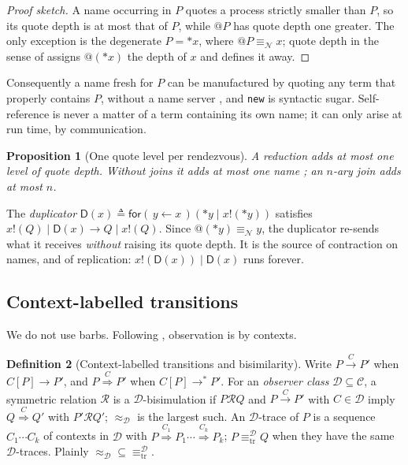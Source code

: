 \documentclass[11pt]{article}
\makeatletter
\theoremstyle{definition}
\newtheorem{definition}{Definition}[section]
\theoremstyle{plain}
\newtheorem{proposition}[definition]{Proposition}
\theoremstyle{remark}
\newcommand{\quo}[1]{@#1}
\newcommand{\drp}[1]{{*}#1}
\newcommand{\inp}[3]{\mathsf{for}(\,#1 \leftarrow #2\,)#3}
\newcommand{\out}[2]{#1!(#2)}
\newcommand{\nequiv}{\equiv_{\mathcal{N}}}
\newcommand{\Ctx}{\mathcal{C}}
\newcommand{\Obs}{\mathcal{D}}
\newcommand{\bisim}{\approx}
\newcommand{\treq}{\equiv_{\mathrm{tr}}}
\newcommand{\Lab}[1]{\xrightarrow{\,#1\,}}
\newcommand{\WLab}[1]{\overset{#1}{\Longrightarrow}}
\newcommand{\Dup}{\mathsf{D}}
\makeatother
\begin{document}
\begin{proof}[Proof sketch]
A name occurring in $P$ quotes a process strictly smaller than $P$, so its
quote depth is at most that of $P$, while $\quo{P}$ has quote depth one
greater. The only exception is the degenerate $P = \drp{x}$, where
$\quo{P} \nequiv x$; quote depth in the sense of \cite{Lybech22}
assigns $\quo{(\drp{x})}$ the depth of $x$ and defines it away.
\end{proof}

Consequently a name fresh for $P$ can be manufactured by quoting any term
that properly contains $P$, without a name server \cite{Scientist,NWNS},
and \texttt{new} is syntactic sugar. Self-reference is never a matter of
a term containing its own name; it can only arise at run time, by
communication.

\begin{proposition}[One quote level per rendezvous]\label{prop:onelevel}
A reduction adds at most one level of quote depth. Without joins it adds
at most one name \cite{NWNS}; an $n$-ary join adds at most $n$.
\end{proposition}

The \emph{duplicator} $\Dup(x) \triangleq \inp{y}{x}{(\drp{y} \mid
\out{x}{\drp{y}})}$ satisfies $\out{x}{Q} \mid \Dup(x) \to Q \mid
\out{x}{Q}$. Since $\quo{(\drp{y})} \nequiv y$, the duplicator re-sends
what it receives \emph{without} raising its quote depth. It is the source
of contraction on names, and of replication: $\out{x}{\Dup(x)} \mid
\Dup(x)$ runs forever.

\subsection{Context-labelled transitions}\label{sec:clb}

We do not use barbs. Following \cite{NWNS}, observation is by contexts.

\begin{definition}[Context-labelled transitions and bisimilarity]
\label{def:clbisim}
Write $P \Lab{C} P'$ when $C[P] \to P'$, and $P \WLab{C} P'$ when $C[P]
\to^* P'$. For an \emph{observer class} $\Obs \subseteq \Ctx$, a symmetric
relation $\mathcal{R}$ is a $\Obs$-bisimulation if $P \mathrel{\mathcal{R}}
Q$ and $P \Lab{C} P'$ with $C \in \Obs$ imply $Q \WLab{C} Q'$ with $P'
\mathrel{\mathcal{R}} Q'$; $\bisim_\Obs$ is the largest such. An
$\Obs$-trace of $P$ is a sequence $C_1 \cdots C_k$ of contexts in $\Obs$
with $P \WLab{C_1} P_1 \cdots \WLab{C_k} P_k$; $P \treq^\Obs Q$ when they
have the same $\Obs$-traces. Plainly $\bisim_\Obs \subseteq
\treq^\Obs$.
\end{definition}
\end{document}
